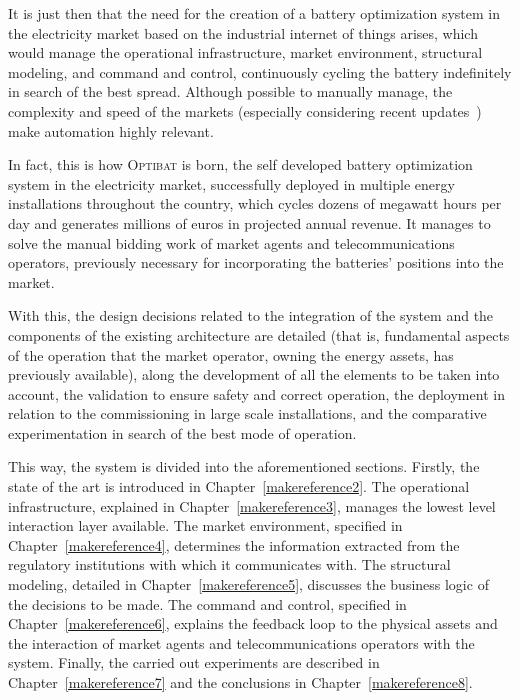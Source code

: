 It is just then that the need for the creation of a battery optimization system in the electricity market based on the industrial internet of things arises, which would manage the operational infrastructure, market environment, structural modeling, and command and control, continuously cycling the battery indefinitely in search of the best spread. Although possible to manually manage, the complexity and speed of the markets (especially considering recent updates~\cite{cnmc2025resolucion, omie2025instruccion}) make automation highly relevant.

In fact, this is how \textsc{Optibat} is born, the self developed battery optimization system in the electricity market, successfully deployed in multiple energy installations throughout the country, which cycles dozens of megawatt hours per day and generates millions of euros in projected annual revenue. It manages to solve the manual bidding work of market agents and telecommunications operators, previously necessary for incorporating the batteries' positions into the market.

With this, the design decisions related to the integration of the system and the components of the existing architecture are detailed (that is, fundamental aspects of the operation that the market operator, owning the energy assets, has previously available), along the development of all the elements to be taken into account, the validation to ensure safety and correct operation, the deployment in relation to the commissioning in large scale installations, and the comparative experimentation in search of the best mode of operation.

This way, the system is divided into the aforementioned sections. Firstly, the state of the art is introduced in Chapter~\ref{makereference2}. The operational infrastructure, explained in Chapter~\ref{makereference3}, manages the lowest level interaction layer available. The market environment, specified in Chapter~\ref{makereference4}, determines the information extracted from the regulatory institutions with which it communicates with. The structural modeling, detailed in Chapter~\ref{makereference5}, discusses the business logic of the decisions to be made. The command and control, specified in Chapter~\ref{makereference6}, explains the feedback loop to the physical assets and the interaction of market agents and telecommunications operators with the system. Finally, the carried out experiments are described in Chapter~\ref{makereference7} and the conclusions in Chapter~\ref{makereference8}.

